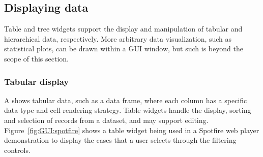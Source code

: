 




\subsection{Displaying data}
\label{sec:GUI:tabular-display}

Table and tree widgets support the display and manipulation of tabular
and hierarchical data, respectively. More arbitrary data
visualization, such as statistical plots, can be drawn within a GUI
window, but such is beyond the scope of this section.


\subsubsection{Tabular display}

A  shows tabular data, such as a data frame, where
each column has a specific data type and cell rendering strategy.
Table widgets handle the display, sorting and selection of records from a
dataset, and may support editing.  Figure~\ref{fig:GUI:spotfire} shows
a table widget being used in a Spotfire web player demonstration to
display the cases that a user selects through the filtering controls.


